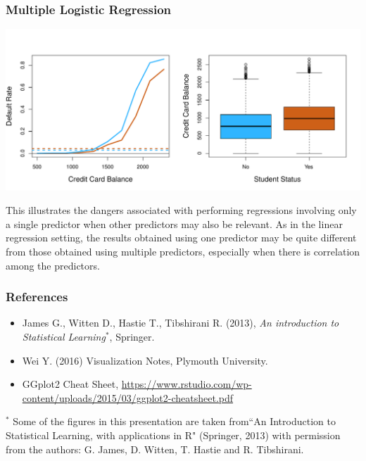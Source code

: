 \documentclass{beamer}
\begin{document}

\frame
{\frametitle{Multiple Logistic Regression}

\includegraphics[scale=0.5]{figures/student}

This illustrates the dangers associated  with performing  regressions involving
only a single predictor  when other predictors may also be relevant.  As in
the linear regression setting, the results obtained using one predictor may be
quite different from those obtained using  multiple predictors, especially when there is correlation among the predictors.
}

\frame
{\frametitle{References}
\begin{itemize}
\item James G., Witten D., Hastie T., Tibshirani R. (2013), \textit{An introduction to Statistical Learning}$^*$, Springer.
\item Wei Y. (2016) Visualization Notes,  Plymouth University.
\item GGplot2 Cheat Sheet, \url{https://www.rstudio.com/wp-content/uploads/2015/03/ggplot2-cheatsheet.pdf}
\end{itemize}

\vspace{1cm}

$^*$ {\tiny Some of the figures in this presentation are taken from``An Introduction to Statistical Learning, with applications in R"  (Springer, 2013) with permission from the authors: G. James, D. Witten,  T. Hastie and R. Tibshirani.}
}
\end{document}

